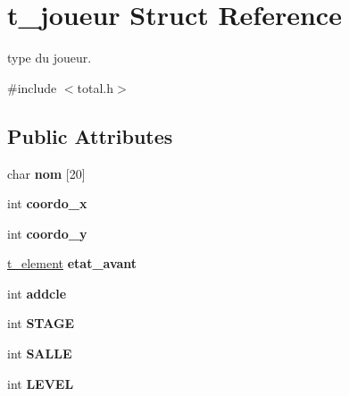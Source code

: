 \hypertarget{structt__joueur}{}\section{t\+\_\+joueur Struct Reference}
\label{structt__joueur}


type du joueur.  




{\ttfamily \#include $<$total.\+h$>$}

\subsection*{Public Attributes}
\begin{DoxyCompactItemize}
\item 
char {\bfseries nom} \mbox{[}20\mbox{]}\hypertarget{structt__joueur_a064e13795b30484e6faa1738739bc7bc}{}\label{structt__joueur_a064e13795b30484e6faa1738739bc7bc}

\item 
int {\bfseries coordo\+\_\+x}\hypertarget{structt__joueur_a987d204c2c8f75dc8c86c3c7cb068925}{}\label{structt__joueur_a987d204c2c8f75dc8c86c3c7cb068925}

\item 
int {\bfseries coordo\+\_\+y}\hypertarget{structt__joueur_a7323e5698a0c73ec7c832e04aecfd6aa}{}\label{structt__joueur_a7323e5698a0c73ec7c832e04aecfd6aa}

\item 
\hyperlink{total_8h_a8b071baf43ce73c99f88fc8169b0514d}{t\+\_\+element} {\bfseries etat\+\_\+avant}\hypertarget{structt__joueur_a1bca9feb84458e2d91467c2cfe2726ce}{}\label{structt__joueur_a1bca9feb84458e2d91467c2cfe2726ce}

\item 
int {\bfseries addcle}\hypertarget{structt__joueur_a9968b8be2a2e33cf21326ea498e1f3c1}{}\label{structt__joueur_a9968b8be2a2e33cf21326ea498e1f3c1}

\item 
int {\bfseries S\+T\+A\+GE}\hypertarget{structt__joueur_a4f51a9801b83bc16f11b22b29014227c}{}\label{structt__joueur_a4f51a9801b83bc16f11b22b29014227c}

\item 
int {\bfseries S\+A\+L\+LE}\hypertarget{structt__joueur_af7c21acb1e1d31dcfa22965268391b7e}{}\label{structt__joueur_af7c21acb1e1d31dcfa22965268391b7e}

\item 
int {\bfseries L\+E\+V\+EL}\hypertarget{structt__joueur_a489ad8b9028b6ae20812e55db7e14596}{}\label{structt__joueur_a489ad8b9028b6ae20812e55db7e14596}


\end{DoxyCompactItemize}
